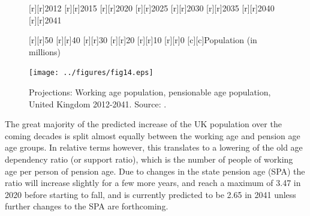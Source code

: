 \documentclass[11 pt, a4paper]{report}
\begin{document}
\begin{figure}[hbtp!]
[r][r]{\small{2012}}
[r][r]{\small{2015}}
[r][r]{\small{2020}}
[r][r]{\small{2025}}
[r][r]{\small{2030}}
[r][r]{\small{2035}}
[r][r]{\small{2040}}
[r][r]{\small{2041}}

[r][r]{\small{50}}
[r][r]{\small{40}}
[r][r]{\small{30}}
[r][r]{\small{20}}
[r][r]{\small{10}}
[r][r]{\small{0}}
[c][c]{\small{Population (in millions)}}

\texttt{[image: ../figures/fig14.eps]}
\caption{Projections: Working age population, pensionable age population\protect \footnotemark, United Kingdom 2012-2041. Source: \cite{ONS2013c}.}
 
\label{Fig:14}
\end{figure}

The great majority of the predicted increase of the UK population over the coming decades is split almost equally between the working age and pension age age groups. In relative terms however, this translates to a lowering of the old age dependency ratio (or support ratio), which is the number of people of working age per person of pension age. Due to changes in the state pension age (SPA) the ratio will increase slightly for a few more years, and reach a maximum of 3.47 in 2020 before starting to fall, and is currently predicted to be 2.65 in 2041 unless further changes to the SPA are forthcoming. 


\end{document}
